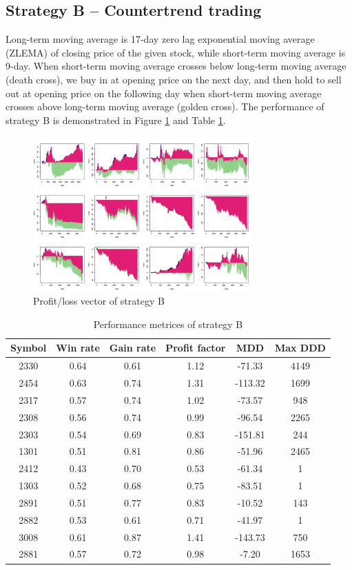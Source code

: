 \documentclass[12pt, letterpaper, oneside]{article}
\begin{document}
\subsection{Strategy B -- Countertrend trading}
Long-term moving average is 17-day zero lag exponential moving average (ZLEMA) of closing price of the given stock, while short-term moving average is 9-day. When short-term moving average crosses below long-term moving average (death cross), we buy in at opening price on the next day, and then hold to sell out at opening price on the following day when short-term moving average crosses above long-term moving average (golden cross). The performance of strategy B is demonstrated in Figure \ref{fig:b} and Table \ref{table:b}.

\begin{figure}[h]
    \centering
    \includegraphics[width=0.75\textwidth]{sb_pl}
    \caption{Profit/loss vector of strategy B}
    \label{fig:b}
\end{figure}

\begin{table}[h!]
    \centering
    \begin{tabular}{ |c|c|c|c|c|c| }
        \hline
        Symbol & Win rate & Gain rate & Profit factor & MDD & Max DDD \\ [0.5ex]
        \hline
        2330 & 0.64 & 0.61 & 1.12 & -71.33 & 4149 \\
        2454 & 0.63 & 0.74 & 1.31 & -113.32 & 1699 \\
        2317 & 0.57 & 0.74 & 1.02 & -73.57 & 948 \\
        2308 & 0.56 & 0.74 & 0.99 & -96.54 & 2265 \\
        2303 & 0.54 & 0.69 & 0.83 & -151.81 & 244 \\
        1301 & 0.51 & 0.81 & 0.86 & -51.96 & 2465 \\
        2412 & 0.43 & 0.70 & 0.53 & -61.34 & 1 \\
        1303 & 0.52 & 0.68 & 0.75 & -83.51 & 1 \\
        2891 & 0.51 & 0.77 & 0.83 & -10.52 & 143 \\
        2882 & 0.53 & 0.61 & 0.71 & -41.97 & 1 \\
        3008 & 0.61 & 0.87 & 1.41 & -143.73 & 750 \\
        2881 & 0.57 & 0.72 & 0.98 & -7.20 & 1653 \\ [0.5ex]
        \hline
    \end{tabular}
    \caption{Performance metrices of strategy B}
    \label{table:b}
\end{table}
\end{document}
